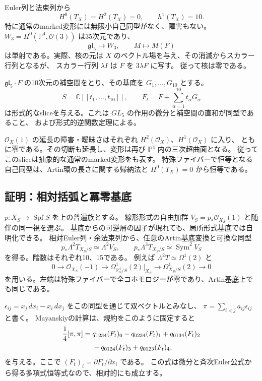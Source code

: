 \documentclass[a4paper,11pt]{ltjsarticle}
\theoremstyle{definition}
\newcommand{\CC}{\mathbb C}
\newcommand{\OO}{\mathcal O}
\newcommand{\PP}{\mathbb P}
\newcommand{\Spf}{\operatorname{Spf}}
\newcommand{\Sym}{\operatorname{Sym}}
\begin{document}
Euler列と法束列から
\[
 H^0(T_X)=H^2(T_X)=0,\qquad h^1(T_X)=10.
\]
特に通常のmarked変形には無限小自己同型がなく、障害もない。
$W_3=H^0(\PP^4,\OO(3))$ は35次元であり、
\[
 \mathfrak{gl}_5\longrightarrow W_3,\qquad M\longmapsto M(F)
\]
は単射である。実際、核の元は $X$ のベクトル場を与え、その消滅からスカラー行列となるが、
スカラー行列 $\lambda I$ は $F$ を $3\lambda F$ に写す。
従って核は零である。

$\mathfrak{gl}_5\cdot F$ の10次元の補空間をとり、その基底を $G_1,\ldots,G_{10}$ とする。
\[
 S=\CC[[t_1,\ldots,t_{10}]],\qquad
 F_t=F+\sum_{\alpha=1}^{10}t_\alpha G_\alpha
\]
は形式的なsliceを与える。これは $GL_5$ の作用の微分と補空間の直和が同型であること、
および形式的逆関数定理による。

$\OO_X(1)$ の延長の障害・曖昧さはそれぞれ $H^2(\OO_X)$、$H^1(\OO_X)$ に入り、
ともに零である。その切断も延長し、変形は再び $\PP^4$ 内の三次超曲面となる。
従ってこのsliceは抽象的な通常のmarked変形をも表す。
特殊ファイバーで恒等となる自己同型は、Artin環の長さに関する帰納法と
$H^0(T_X)=0$ から恒等である。

\subsection{証明：相対括弧と冪零基底}

$p:X_S\to\Spf S$ を上の普遍族とする。
線形形式の自由加群 $V_S=p_*\OO_{X_S}(1)$ と随伴の同一視を選ぶ。
基底からの可逆層の因子が現れても、局所形式基底では自明化できる。
相対Euler列・余法束列から、任意のArtin基底変換と可換な同型
\[
 p_*\Lambda^2T_{X_S/S}\simeq\Lambda^2 V_S,\qquad
 p_*\Lambda^3T_{X_S/S}\simeq\Sym^2V_S
\]
を得る。階数はそれぞれ10、15である。
例えば $\Lambda^2T\simeq\Omega^1(2)$ と
\[
 0\longrightarrow\OO_{X_S}(-1)
 \longrightarrow\Omega^1_{\PP^4_S/S}(2)|_{X_S}
 \longrightarrow\Omega^1_{X_S/S}(2)\longrightarrow0
\]
を用いる。左端は特殊ファイバーで全コホモロジーが零であり、Artin基底上でも同じである。

$\epsilon_{ij}=x_j\,dx_i-x_i\,dx_j$ をこの同型を通じて双ベクトルとみなし、
$\pi=\sum_{i<j}a_{ij}\epsilon_{ij}$ と書く。
Mayanskiyの計算は、規約をこのように固定すると
\begin{align}
 \frac14[\pi,\pi]
 ={}&q_{1234}(F_t)_0-q_{0234}(F_t)_1+q_{0134}(F_t)_2 \notag\\
    &-q_{0124}(F_t)_3+q_{0123}(F_t)_4, \label{eq:bracket}
\end{align}
を与える。ここで $(F_t)_i=\partial F_t/\partial x_i$ である。
この式は微分と斉次Euler公式から得る多項式恒等式なので、相対的にも成立する。
\end{document}
